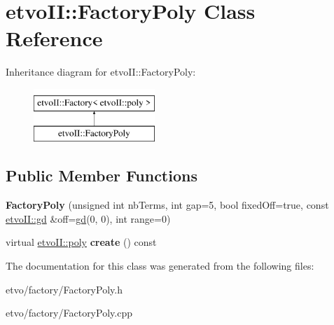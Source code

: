 \hypertarget{classetvo_i_i_1_1_factory_poly}{}\section{etvo\+II\+:\+:Factory\+Poly Class Reference}
\label{classetvo_i_i_1_1_factory_poly}
Inheritance diagram for etvo\+II\+:\+:Factory\+Poly\+:\begin{figure}[H]
\begin{center}
\leavevmode
\includegraphics[height=2.000000cm]{classetvo_i_i_1_1_factory_poly}
\end{center}
\end{figure}
\subsection*{Public Member Functions}
\begin{DoxyCompactItemize}
\item 
\mbox{\label{classetvo_i_i_1_1_factory_poly_a5d17d3f7ea7986f679a4071df664a23b}} 
{\bfseries Factory\+Poly} (unsigned int nb\+Terms, int gap=5, bool fixed\+Off=true, const \mbox{\hyperlink{classetvo_i_i_1_1gd}{etvo\+I\+I\+::gd}} \&off=\mbox{\hyperlink{classetvo_i_i_1_1gd}{gd}}(0, 0), int range=0)
\item 
\mbox{\label{classetvo_i_i_1_1_factory_poly_ac42e8caed1fb4e62384c2fb49e6e7dfa}} 
virtual \mbox{\hyperlink{classetvo_i_i_1_1poly}{etvo\+I\+I\+::poly}} {\bfseries create} () const
\end{DoxyCompactItemize}


The documentation for this class was generated from the following files\+:\begin{DoxyCompactItemize}
\item 
etvo/factory/Factory\+Poly.\+h\item 
etvo/factory/Factory\+Poly.\+cpp\end{DoxyCompactItemize}
